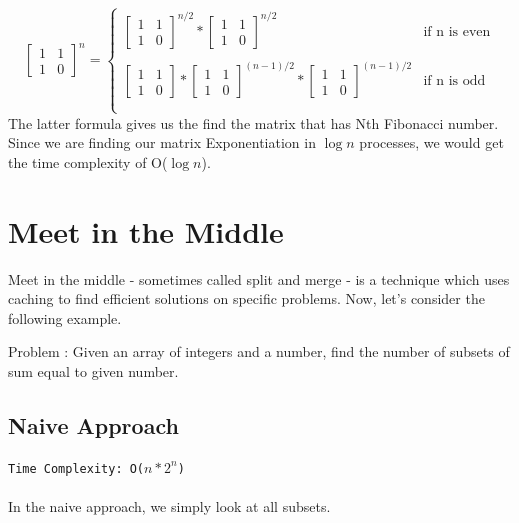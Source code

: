 \documentclass[12pt]{article}
\begin{document}
\begin{equation}
    \begin{bmatrix}
        1 & 1  \\
        1 & 0
    \end{bmatrix}^{n} =
  \begin{cases}
    \begin{bmatrix}
        1 & 1  \\
        1 & 0
    \end{bmatrix}^{n/2} 
    * 
    \begin{bmatrix}
        1 & 1  \\
        1 & 0
    \end{bmatrix}^{n/2} & \text{if n is even} \\\\
    \begin{bmatrix}
        1 & 1  \\
        1 & 0
    \end{bmatrix}
    *
    \begin{bmatrix}
        1 & 1  \\
        1 & 0
    \end{bmatrix}^{(n-1)/2} 
    * 
    \begin{bmatrix}
        1 & 1  \\
        1 & 0
    \end{bmatrix}^{(n-1)/2}& \text{if n is odd} \\\\
  \end{cases}
\end{equation}
The latter formula gives us the find the matrix that has Nth Fibonacci number. Since we are finding our matrix Exponentiation in $\log{n}$ processes, we would get the time complexity of O($\log{n}$).
\clearpage

\section{Meet in the Middle}
Meet in the middle - sometimes called split and merge - is a technique which uses caching to find efficient solutions on specific problems. Now, let's consider the following example.

Problem : Given an array of integers and a number, find the number of subsets of sum equal to given number.

\subsection{Naive Approach }
\texttt{Time Complexity: O($n*2^n$) } \\ \\
In the naive approach, we simply look at all subsets.
\end{document}
